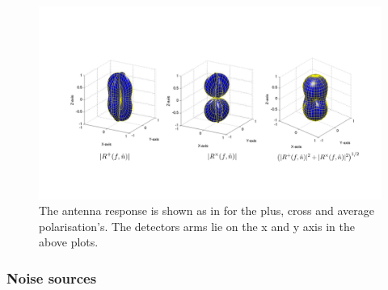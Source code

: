\begin{figure}
    \centering
    \includegraphics[width=\textwidth]{C1_intro/LIGO_beam_patterns.png}
    \caption[Antenna response of the \gls{LIGO} detectors.]{The antenna response is shown as in \citep{romano2019SearchesStochastic} for the plus, cross and average polarisation's. The detectors arms lie on the x and y axis in the above plots. }
    \label{intro:detectors:response}
\end{figure}

\subsubsection{\label{intro:detector:noise}Noise sources}

